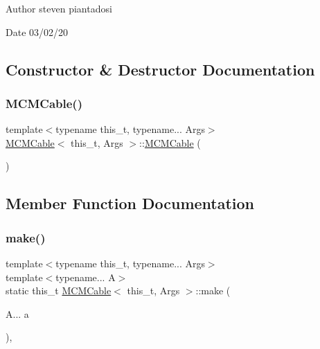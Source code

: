 \begin{DoxyAuthor}{Author}
steven piantadosi 
\end{DoxyAuthor}
\begin{DoxyDate}{Date}
03/02/20 
\end{DoxyDate}


\subsection{Constructor \& Destructor Documentation}
\mbox{\label{class_m_c_m_cable_a3bc2cc7dd7cf2385ade7c82a51f3a566}} 
\subsubsection{\texorpdfstring{M\+C\+M\+Cable()}{MCMCable()}}
{\footnotesize\ttfamily template$<$typename this\+\_\+t, typename... Args$>$ \\
\hyperlink{class_m_c_m_cable}{M\+C\+M\+Cable}$<$ this\+\_\+t, Args $>$\+::\hyperlink{class_m_c_m_cable}{M\+C\+M\+Cable} (\begin{DoxyParamCaption}{ }\end{DoxyParamCaption})\hspace{0.3cm}{\ttfamily [inline]}}



\subsection{Member Function Documentation}
\mbox{\label{class_m_c_m_cable_a75b545fc2afd188bfdd199a7256eeed9}} 
\subsubsection{\texorpdfstring{make()}{make()}}
{\footnotesize\ttfamily template$<$typename this\+\_\+t, typename... Args$>$ \\
template$<$typename... A$>$ \\
static this\+\_\+t \hyperlink{class_m_c_m_cable}{M\+C\+M\+Cable}$<$ this\+\_\+t, Args $>$\+::make (\begin{DoxyParamCaption}\item[{A...}]{a }\end{DoxyParamCaption})\hspace{0.3cm}{\ttfamily [inline]}, {\ttfamily [static]}}



